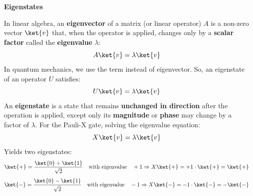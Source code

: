 \begin{flushleft}
   \textcolor{Green3}{ \textbf{Eigenstates}}
\end{flushleft}
In linear algebra, an \textbf{eigenvector} of a matrix (or linear operator) $A$ is a non-zero vector $\ket{v}$ that, when the operator is applied, changes only by a \textbf{scalar factor} called the \textbf{eigenvalue} $\lambda$:
\begin{equation*}
   A\ket{v} = \lambda \ket{v}
\end{equation*}
In quantum mechanics, we use the term  instead of eigenvector. So, an eigenstate of an operator $U$ satisfies:
\begin{equation*}
   U\ket{v} = \lambda \ket{v}
\end{equation*}
An \textbf{eigenstate} is a state that remains \textbf{unchanged in direction} after the operation is applied, except only its \textbf{magnitude} or \textbf{phase} may change by a factor of $\lambda$. For the Pauli-X gate, solving the eigenvalue equation:
\begin{equation*}
   X\ket{v} = \lambda \ket{v}
\end{equation*}
Yields two eigenstates:
\begin{equation}
   \ket{+} = \dfrac{\ket{0} + \ket{1}}{\sqrt{2}} \quad \text{with eigenvalue} \quad +1 \Rightarrow X\ket{+} = +1 \cdot \ket{+} = \ket{+}
\end{equation}
\begin{equation}
   \ket{-} = \dfrac{\ket{0} - \ket{1}}{\sqrt{2}} \quad \text{with eigenvalue} \quad -1 \Rightarrow X\ket{-} = -1 \cdot \ket{-} = -\ket{-}
\end{equation}

